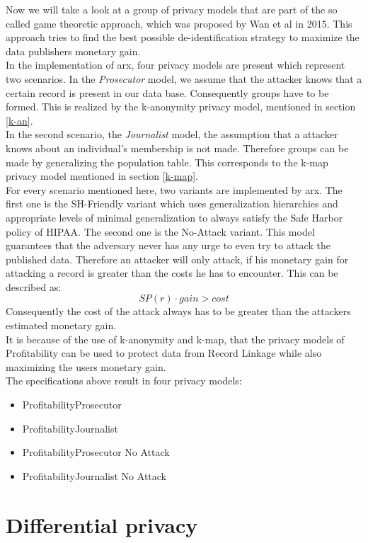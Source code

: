 \documentclass[12pt, a4paper,oneside]{report}
\begin{document}
Now we will take a look at a group of privacy models that are part of the so called game theoretic approach, which was proposed by Wan et al in 2015. This approach tries to find the best possible de-identification strategy to maximize the data publishers monetary gain\cite{Wan}.\\
In the implementation of arx, four privacy models are present which represent two scenarios. In the \textit{Prosecutor} model, we assume that the attacker knows that a certain record is present in our data base. Consequently groups have to be formed. This is realized by the k-anonymity privacy model, mentioned in section \ref{k-an}.\\
In the second scenario, the \textit{Journalist} model, the assumption that a attacker knows about an individual's membership is not made. Therefore groups can be made by generalizing the population table. This corresponds to the k-map privacy model mentioned in section \ref{k-map}\cite{Prasser2017}.\\
For every scenario mentioned here, two variants are implemented by arx. The first one is the SH-Friendly variant which uses generalization hierarchies and appropriate levels of minimal generalization to always satisfy the Safe Harbor policy of HIPAA. The second one is the No-Attack variant. This model guarantees that the adversary never has any urge to even try to attack the published data. Therefore an attacker will only attack, if his monetary gain for attacking a record is greater than the costs he has to encounter. This can be described as:
\[SP(r) \cdot gain > cost\]
Consequently the cost of the attack always has to be greater than the attackers estimated monetary gain.\cite{Prasser2017}\\
It is because of the use of k-anonymity and k-map, that the privacy models of Profitability can be used to protect data from Record Linkage while also maximizing the users monetary gain.\\
The specifications above result in four privacy models:
\begin{itemize}
	\item ProfitabilityProsecutor
	\item ProfitabilityJournalist
	\item ProfitabilityProsecutor No Attack
	\item ProfitabilityJournalist No Attack
\end{itemize}


\section{Differential privacy}
\end{document}
